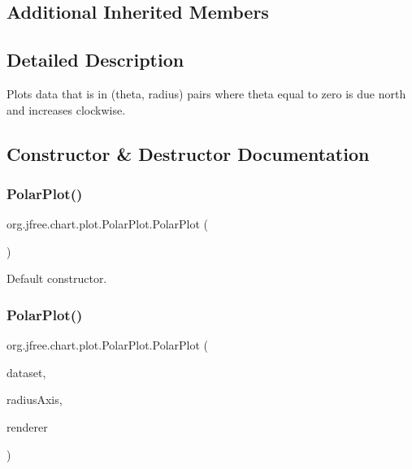\subsection*{Additional Inherited Members}


\subsection{Detailed Description}
Plots data that is in (theta, radius) pairs where theta equal to zero is due north and increases clockwise. 

\subsection{Constructor \& Destructor Documentation}
\mbox{\label{classorg_1_1jfree_1_1chart_1_1plot_1_1_polar_plot_a16b66a9d54995e2b91f5928f9ea6e6a7}} 
\subsubsection{\texorpdfstring{Polar\+Plot()}{PolarPlot()}\hspace{0.1cm}{\footnotesize\ttfamily [1/2]}}
{\footnotesize\ttfamily org.\+jfree.\+chart.\+plot.\+Polar\+Plot.\+Polar\+Plot (\begin{DoxyParamCaption}{ }\end{DoxyParamCaption})}

Default constructor. \mbox{\label{classorg_1_1jfree_1_1chart_1_1plot_1_1_polar_plot_ac22d804704e7b6c12e2cab3617859671}} 
\subsubsection{\texorpdfstring{Polar\+Plot()}{PolarPlot()}\hspace{0.1cm}{\footnotesize\ttfamily [2/2]}}
{\footnotesize\ttfamily org.\+jfree.\+chart.\+plot.\+Polar\+Plot.\+Polar\+Plot (\begin{DoxyParamCaption}\item[{\mbox{\hyperlink{interfaceorg_1_1jfree_1_1data_1_1xy_1_1_x_y_dataset}{X\+Y\+Dataset}}}]{dataset,  }\item[{\mbox{\hyperlink{classorg_1_1jfree_1_1chart_1_1axis_1_1_value_axis}{Value\+Axis}}}]{radius\+Axis,  }\item[{\mbox{\hyperlink{interfaceorg_1_1jfree_1_1chart_1_1renderer_1_1_polar_item_renderer}{Polar\+Item\+Renderer}}}]{renderer }\end{DoxyParamCaption})}

